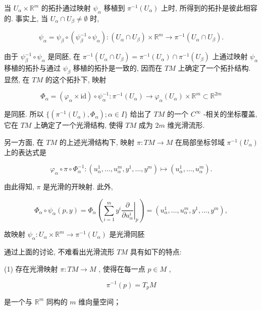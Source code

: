 当  $U_{\alpha} \times \mathbb{R}^{m}$  的拓扑通过映射  $\psi_{\alpha}$  移植到  $\pi^{-1}(U_{\alpha})$  上时, 所得到的拓扑是彼此相容的. 事实上, 当  $U_{\alpha} \cap U_{\beta} \neq \emptyset$  时,

$$
\psi_ {\alpha} = \psi_ {\beta} \circ (\psi_ {\beta} ^ {- 1} \circ \psi_ {\alpha}): (U _ {\alpha} \cap U _ {\beta}) \times \mathbb {R} ^ {m} \rightarrow \pi^ {- 1} (U _ {\alpha} \cap U _ {\beta}).
$$

由于  $\psi_{\beta}^{-1}\circ \psi_{\alpha}$  是同胚, 在  $\pi^{-1}(U_{\alpha}\cap U_{\beta}) = \pi^{-1}(U_{\alpha})\cap \pi^{-1}(U_{\beta})$  上通过映射  $\psi_{\alpha}$  移植的拓扑与通过  $\psi_{\beta}$  移植的拓扑是一致的, 因而在  $TM$  上确定了一个拓扑结构. 显然, 在  $TM$  的这个拓扑下, 映射

$$
\Phi_ {\alpha} = \left(\varphi_ {\alpha} \times \mathrm {i d}\right) \circ \psi_ {\alpha} ^ {- 1}: \pi^ {- 1} \left(U _ {\alpha}\right)\rightarrow \varphi_ {\alpha} \left(U _ {\alpha}\right) \times \mathbb {R} ^ {m} \subset \mathbb {R} ^ {2 m}
$$

是同胚. 所以  $\{(\pi^{-1}(U_{\alpha}), \Phi_{\alpha}); \alpha \in I\}$  给出了  $TM$  的一个  $C^\infty$ -相关的坐标覆盖, 它在  $TM$  上确定了一个光滑结构, 使得  $TM$  成为  $2m$  维光滑流形.

另一方面, 在  $TM$  的上述光滑结构下, 映射  $\pi: TM \to M$  在局部坐标邻域  $\pi^{-1}(U_{\alpha})$  上的表达式是

$$
\varphi_ {\alpha} \circ \pi \circ \Phi_ {\alpha} ^ {- 1}: \left(u _ {\alpha} ^ {1}, \dots , u _ {\alpha} ^ {m}, y ^ {1}, \dots , y ^ {m}\right) \mapsto \left(u _ {\alpha} ^ {1}, \dots , u _ {\alpha} ^ {m}\right).
$$

由此得知,  $\pi$  是光滑的开映射. 此外,

$$
\Phi_ {\alpha} \circ \psi_ {\alpha} (p, y) = \Phi_ {\alpha} \left(\sum_ {i = 1} ^ {m} y ^ {i} \left. \frac {\partial}{\partial u _ {\alpha} ^ {i}} \right| _ {p}\right) = \left(u _ {\alpha} ^ {1}, \dots , u _ {\alpha} ^ {m}, y ^ {1}, \dots , y ^ {m}\right),
$$

故映射  $\psi_{\alpha}:U_{\alpha}\times \mathbb{R}^{m}\to \pi^{-1}(U_{\alpha})$  是光滑同胚

通过上面的讨论, 不难看出光滑流形  $TM$  具有如下的特点:

(1) 存在光滑映射  $\pi: TM \to M$ , 使得在每一点  $p \in M$ ,

$$
\pi^ {- 1} (p) = T _ {p} M
$$

是一个与  $\mathbb{R}^m$  同构的  $m$  维向量空间；

